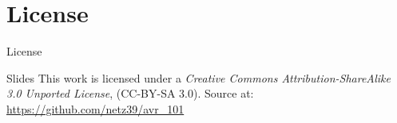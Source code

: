 \documentclass{beamer}
\begin{document}
\appendix

\section{License}

\begin{frame}{License}
    \begin{block}{Slides}
        This work is licensed under a \emph{Creative Commons
        Attribution-ShareAlike 3.0 Unported License}, (CC-BY-SA 3.0).
        Source at: \url{https://github.com/netz39/avr_101}
    \end{block}
\end{frame}
\end{document}
